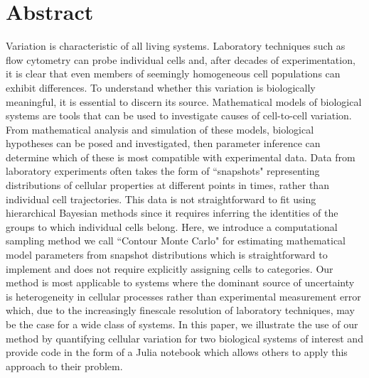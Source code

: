 \documentclass[10pt,letterpaper]{article}
\begin{document}
\newpage
\linenumbers
\section{Abstract}
Variation is characteristic of all living systems. Laboratory techniques such as flow cytometry can probe individual cells and, after decades of experimentation, it is clear that even members of seemingly homogeneous cell populations can exhibit differences. To understand whether this variation is biologically meaningful, it is essential to discern its source. Mathematical models of biological systems are tools that can be used to investigate causes of cell-to-cell variation. From mathematical analysis and simulation of these models, biological hypotheses can be posed and investigated, then parameter inference can determine which of these is most compatible with experimental data. Data from laboratory experiments often takes the form of ``snapshots" representing distributions of cellular properties at different points in times, rather than individual cell trajectories. This data is not straightforward to fit using hierarchical Bayesian methods since it requires inferring the identities of the groups to which individual cells belong. Here, we introduce a computational sampling method we call ``Contour Monte Carlo" for estimating mathematical model parameters from snapshot distributions which is straightforward to implement and does not require explicitly assigning cells to categories. Our method is most applicable to systems where the dominant source of uncertainty is heterogeneity in cellular processes rather than experimental measurement error which, due to the increasingly finescale resolution of laboratory techniques, may be the case for a wide class of systems. In this paper, we illustrate the use of our method by quantifying cellular variation for two biological systems of interest and provide code in the form of a Julia notebook which allows others to apply this approach to their problem.
\end{document}
